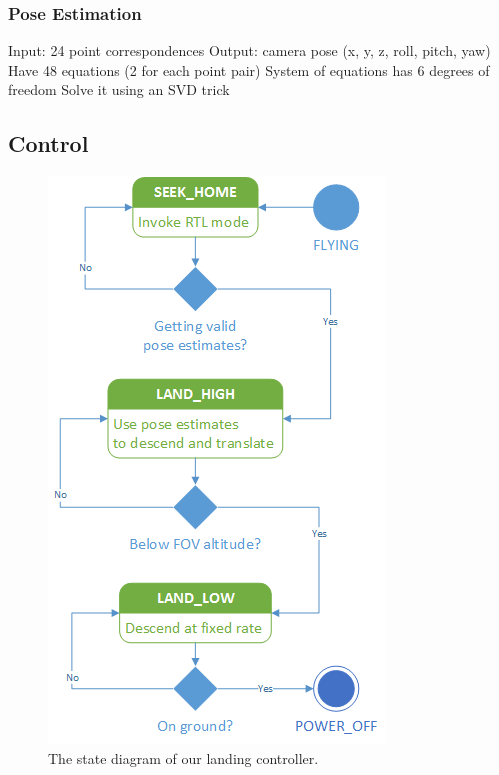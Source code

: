 \documentclass[10pt]{scrartcl} %
\begin{document}
\subsubsection{Pose Estimation}

Input: 24 point correspondences
Output: camera pose (x, y, z, roll, pitch, yaw)
Have 48 equations (2 for each point pair)
System of equations has 6 degrees of freedom
Solve it using an SVD trick


\subsection{Control}



\begin{figure}[h]
    \centering
    \includegraphics{images/statediagram.png}
    \caption{The state diagram of our landing controller.}
    \label{fig:statediagram}
\end{figure}
\end{document}
